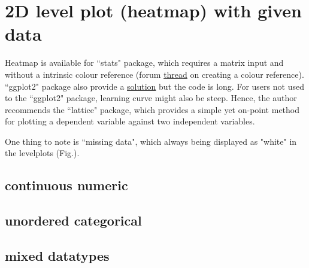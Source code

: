 \documentclass[../note.tex]{subfiles} %
\begin{document}
\section{2D level plot (heatmap) with given data}
Heatmap is available for ``stats" package\autocite{Rcore}, which requires a matrix input and without a intrinsic colour reference (forum \href{https://stackoverflow.com/questions/9314658/colorbar-from-custom-colorramppalette}{thread} on creating a colour reference).  ``ggplot2" package\autocite{ggplot} also provide a \href{https://stackoverflow.com/questions/43772017/continuous-gradient-color-fixed-scale-heatmap-ggplot2}{solution} but the code is long.  For users not used to the ``ggplot2" package, learning curve might also be steep.  Hence, the author recommends the ``lattice" package\autocite{lattice}, which provides a simple yet on-point method for plotting a dependent variable against two independent variables.

One thing to note is ``missing data", which always being displayed as "white" in the levelplots (Fig.).

\subsection{continuous numeric}


\subsection{unordered categorical}


\subsection{mixed datatypes}
\end{document}
